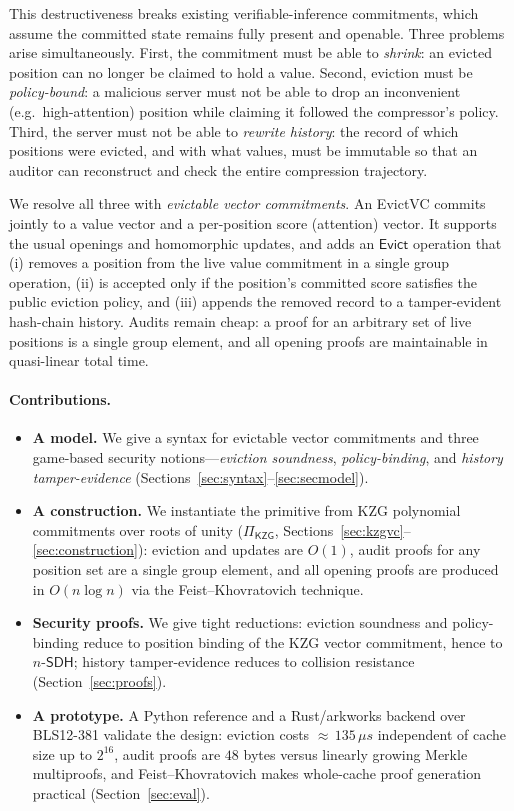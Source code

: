 \documentclass[version=submission]{iacrcc}
\theoremstyle{definition}
\newcommand{\Evict}{\mathsf{Evict}}
\newcommand{\nsdh}{n\text{-}\mathsf{SDH}}
\begin{document}
This destructiveness breaks existing verifiable-inference commitments, which
assume the committed state remains fully present and openable. Three problems
arise simultaneously. First, the commitment must be able to \emph{shrink}: an
evicted position can no longer be claimed to hold a value. Second, eviction must
be \emph{policy-bound}: a malicious server must not be able to drop an
inconvenient (e.g.\ high-attention) position while claiming it followed the
compressor's policy. Third, the server must not be able to \emph{rewrite history}:
the record of which positions were evicted, and with what values, must be
immutable so that an auditor can reconstruct and check the entire compression
trajectory.

We resolve all three with \emph{evictable vector commitments}. An EvictVC commits
jointly to a value vector and a per-position score (attention) vector. It
supports the usual openings and homomorphic updates, and adds an $\Evict$
operation that (i) removes a position from the live value commitment in a single
group operation, (ii) is accepted only if the position's committed score
satisfies the public eviction policy, and (iii) appends the removed record to a
tamper-evident hash-chain history. Audits remain cheap: a proof for an arbitrary
set of live positions is a single group element, and all opening proofs are
maintainable in quasi-linear total time.

\paragraph{Contributions.}
\begin{itemize}[leftmargin=1.4em,itemsep=2pt]
  \item \textbf{A model.} We give a syntax for evictable vector commitments and
        three game-based security notions---\emph{eviction soundness},
        \emph{policy-binding}, and \emph{history tamper-evidence}
        (Sections~\ref{sec:syntax}--\ref{sec:secmodel}).
  \item \textbf{A construction.} We instantiate the primitive from KZG
        polynomial commitments over roots of unity ($\Pi_{\mathsf{KZG}}$,
        Sections~\ref{sec:kzgvc}--\ref{sec:construction}): eviction and updates
        are $O(1)$, audit proofs for any position set are a single group
        element, and all opening proofs are produced in $O(n\log n)$ via the
        Feist--Khovratovich technique.
  \item \textbf{Security proofs.} We give tight reductions: eviction soundness
        and policy-binding reduce to position binding of the KZG vector
        commitment, hence to $\nsdh$; history tamper-evidence reduces to
        collision resistance (Section~\ref{sec:proofs}).
  \item \textbf{A prototype.} A Python reference and a Rust/arkworks backend over
        BLS12-381 validate the design: eviction costs ${\approx}\,135\,\mu s$
        independent of cache size up to $2^{16}$, audit proofs are $48$ bytes
        versus linearly growing Merkle multiproofs, and Feist--Khovratovich makes
        whole-cache proof generation practical (Section~\ref{sec:eval}).
\end{itemize}
\end{document}
